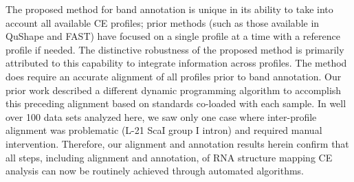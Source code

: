

The proposed method for band annotation is unique in its ability to take into account all available CE profiles; prior methods (such as those available in QuShape and FAST) have focused on a single profile at a time with a reference profile if needed. The distinctive robustness of the proposed method is primarily attributed to this capability to integrate information across profiles. The method does require an accurate alignment of all profiles prior to band annotation. Our prior work \citep{Yoon2011} described a different dynamic programming algorithm to accomplish this preceding alignment based on standards co-loaded with each sample. In well over 100 data sets analyzed here, we saw only one case where inter-profile alignment was problematic (L-21 ScaI group I intron) and required manual intervention. Therefore, our alignment and annotation results herein confirm that all steps, including alignment and annotation, of RNA structure mapping CE analysis can now be routinely achieved through automated algorithms.

